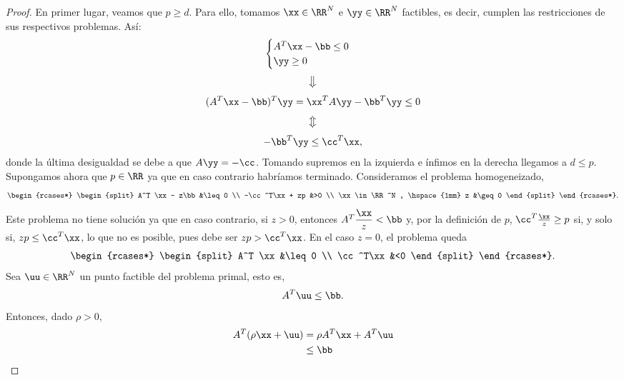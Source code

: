\begin{proof}
	En primer lugar, veamos que $ p \geq d $. Para ello, tomamos $ \xx \in \RR^N$ e $ \yy \in \RR^N $ factibles, es decir, cumplen las restricciones de sus respectivos problemas. Así:
	\[
	\begin{cases}
	A^T \xx - \bb \leq 0 \\
	\yy \geq 0
	\end{cases}
	\]
	\[
	\big\Downarrow
	\]
	\[
	(A^T \xx -\bb)^T\yy =\xx^TA\yy -\bb^T\yy\leq 0
	\]
	\[
	\big\Updownarrow
	\]
	\[
	-\bb^T\yy\leq \cc^T \xx,
	\]
	donde la última desigualdad se debe a que $ A\yy = -\cc $. Tomando supremos en la izquierda e ínfimos en la derecha llegamos a $ d \leq p $. \\
	
	Supongamos ahora que $ p \in \RR $ ya que en caso contrario habríamos terminado. Consideramos el problema homogeneizado, 
	\begin{equation*}
	\begin{rcases*}
	\begin{split} 
	A^T \xx - z\bb&\leq 0  \\
	-\cc^T\xx  + zp &>0  \\
	\xx \in \RR^N , \hspace{1mm} z &\geq 0
	\end{split}
	\end{rcases*}.
	\end{equation*} 
	Este problema no tiene solución ya que en caso contrario, si $ z > 0 $, entonces $ A^T \displaystyle \frac{\xx}{z} < \bb$ y, por la definición de $ p $, $ \cc^T \frac{\xx}{z} \geq p $ si, y solo si, $ zp \leq \cc^T \xx $, lo que no es posible, pues debe ser $ zp > \cc^T\xx $. En el caso $ z=0 $, el problema queda \\
	\begin{equation}\label{eq}
	\begin{rcases*}
	\begin{split} 
	A^T \xx &\leq 0  \\
	\cc^T\xx &<0 
	\end{split}
	\end{rcases*}.
	\end{equation}
	Sea $ \uu \in \RR^N$ un punto factible del problema primal, esto es,
	\[
	A^T\uu \leq \bb.
	\]
	Entonces, dado $ \rho > 0$,
	\begin{equation*}
	\begin{split}
	A^T(\rho\xx + \uu) &= \rho A^T\xx + A^T\uu \\
	&\leq \bb
	\end{split}

\end{equation*}
\end{proof}

